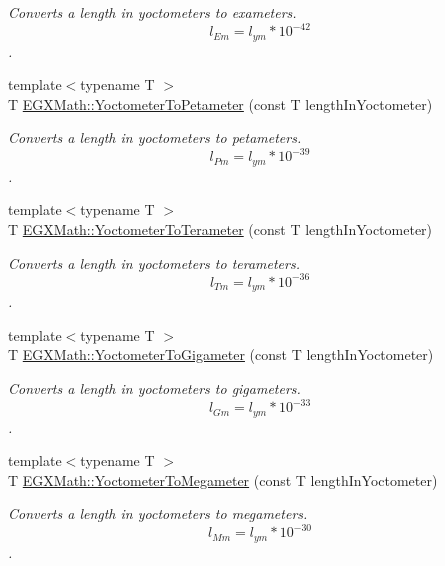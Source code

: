 \begin{DoxyCompactItemize}
\begin{DoxyCompactList}\small\item\em Converts a length in yoctometers to exameters. \[ l_{Em}=l_{ym} * 10^{-42} \]. \end{DoxyCompactList}\item 
{\footnotesize template$<$typename T $>$ }\\T \mbox{\hyperlink{group___e_g_x_math-_conversions-_length_conversions-_s_i-_yoctometer-_s_i_ga8336f2eef297fcf72ddb1fc0f79dfa5e}{E\+G\+X\+Math\+::\+Yoctometer\+To\+Petameter}} (const T length\+In\+Yoctometer)
\begin{DoxyCompactList}\small\item\em Converts a length in yoctometers to petameters. \[ l_{Pm}=l_{ym} * 10^{-39} \]. \end{DoxyCompactList}\item 
{\footnotesize template$<$typename T $>$ }\\T \mbox{\hyperlink{group___e_g_x_math-_conversions-_length_conversions-_s_i-_yoctometer-_s_i_gae5313d3fbe14e0cbb4b58d4d432857e1}{E\+G\+X\+Math\+::\+Yoctometer\+To\+Terameter}} (const T length\+In\+Yoctometer)
\begin{DoxyCompactList}\small\item\em Converts a length in yoctometers to terameters. \[ l_{Tm}=l_{ym} * 10^{-36} \]. \end{DoxyCompactList}\item 
{\footnotesize template$<$typename T $>$ }\\T \mbox{\hyperlink{group___e_g_x_math-_conversions-_length_conversions-_s_i-_yoctometer-_s_i_ga48f8e5df818edfde1006bf08ebdeee33}{E\+G\+X\+Math\+::\+Yoctometer\+To\+Gigameter}} (const T length\+In\+Yoctometer)
\begin{DoxyCompactList}\small\item\em Converts a length in yoctometers to gigameters. \[ l_{Gm}=l_{ym} * 10^{-33} \]. \end{DoxyCompactList}\item 
{\footnotesize template$<$typename T $>$ }\\T \mbox{\hyperlink{group___e_g_x_math-_conversions-_length_conversions-_s_i-_yoctometer-_s_i_ga638081d766f4299ceede9574c1c3242b}{E\+G\+X\+Math\+::\+Yoctometer\+To\+Megameter}} (const T length\+In\+Yoctometer)
\begin{DoxyCompactList}\small\item\em Converts a length in yoctometers to megameters. \[ l_{Mm}=l_{ym} * 10^{-30} \]. \end{DoxyCompactList}\item 

\end{DoxyCompactItemize}
